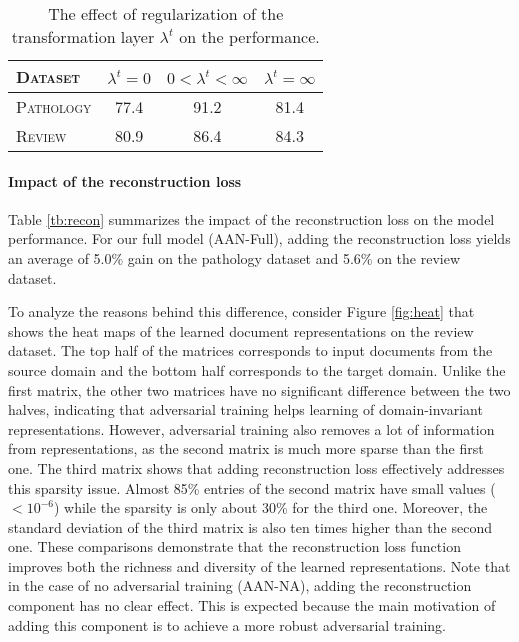 \begin{table}[t]
    \centering
    \begin{tabular}{lccc}
	\toprule
    \textsc{Dataset} & $\lambda^t=0$ & $0<\lambda^t<\infty$ & $\lambda^t=\infty$ \\
    \midrule
    \textsc{Pathology} & 77.4 & 91.2 & 81.4 \\
    \textsc{Review} & 80.9 & 86.4 & 84.3 \\
    \bottomrule
    \end{tabular}
    \caption{The effect of regularization of the transformation layer $\lambda^t$ on the performance. 
    }\label{tb:transformation}
\end{table}

\paragraph{Impact of the reconstruction loss} Table \ref{tb:recon} summarizes the impact of the reconstruction loss on the model performance. For our full model (AAN-Full), adding the reconstruction loss yields an average of 5.0\% gain on the pathology dataset and 5.6\% on the review dataset.

To analyze the reasons behind this difference, consider 
Figure \ref{fig:heat} that shows the heat maps of the learned document representations on the review dataset.
The top half of the matrices corresponds to input documents from the source domain and the bottom half corresponds to the target domain. Unlike the first matrix, the other two matrices have no significant difference between the two halves, indicating that adversarial training helps learning of domain-invariant representations. However, adversarial training also removes a lot of information from representations, as the second matrix is much more sparse than the first one. 
The third matrix shows that adding reconstruction loss effectively addresses this sparsity issue. Almost 85\% entries of the second matrix have small values ($<10^{-6}$) while the sparsity is only about 30\% for the third one. Moreover, the standard deviation of the third matrix is also ten times higher than the second one. These comparisons demonstrate that the reconstruction loss function improves both the richness and diversity of the learned representations. 
Note that in the case of no adversarial training (AAN-NA), adding the reconstruction component has no clear effect. This is expected because the main motivation of adding this component is to achieve a more robust adversarial training.

